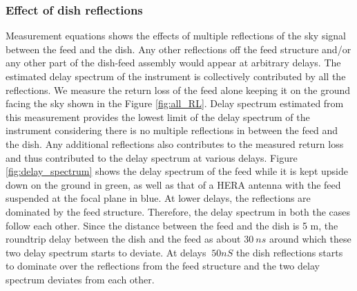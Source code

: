 \documentclass[twocolumn]{emulateapj}
\begin{document}
\subsubsection{\textbf{Effect of dish reflections}}
Measurement equations shows the effects of multiple reflections of the sky signal between the feed and the dish. Any other reflections off the feed structure and/or any other part of the dish-feed assembly would appear at arbitrary delays. The estimated delay spectrum of the instrument is collectively contributed by all the reflections. We measure the return loss of the feed alone keeping it on the ground facing the sky shown in the Figure \ref{fig:all_RL}. Delay spectrum estimated from this measurement provides the lowest limit of the delay spectrum of the instrument considering there is no multiple reflections in between the feed and the dish. 
 Any additional reflections also contributes to the measured return loss and thus contributed to the delay spectrum at various delays. Figure \ref{fig:delay_spectrum} shows the delay spectrum of the feed while it is kept upside down on the ground in green, as well as that of a HERA antenna with the feed suspended at the focal plane in blue. At lower delays, the reflections are dominated by the feed structure. Therefore, the delay spectrum in both the cases follow each other. Since the distance between the feed and the dish is 5 m, the roundtrip delay between the dish and the feed as about $30~ns$ around which these two delay spectrum starts to deviate. At delays $\> 50nS$ the dish reflections starts to dominate over the reflections from the feed structure and the two delay spectrum deviates from each other. 
\end{document}
